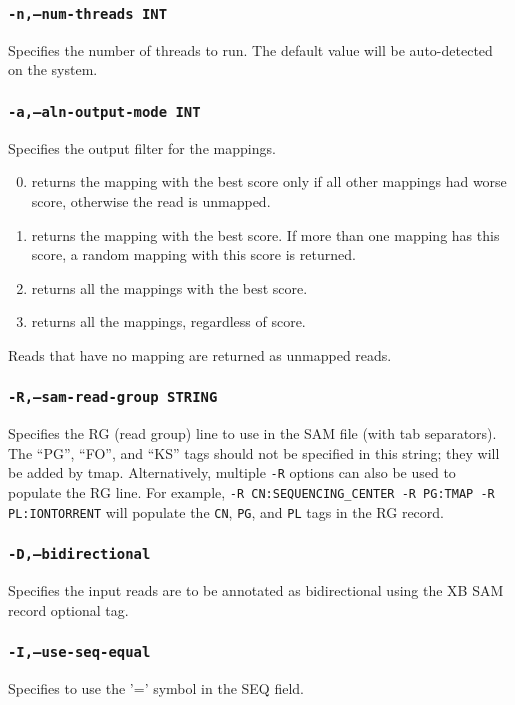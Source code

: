\documentclass[a4paper,12pt]{book}
\newcommand{\TT}[1]{{\tt #1}} %
\begin{document}
\subsubsection{\TT{-n,--num-threads INT}}
Specifies the number of threads to run.
The default value will be auto-detected on the system.

\subsubsection{\TT{-a,--aln-output-mode INT}}
Specifies the output filter for the mappings.
\begin{enumerate}
	\setcounter{enumi}{-1} %
	\item returns the mapping with the best score only if all other mappings had worse score, otherwise the read is unmapped.
	\item returns the mapping with the best score.  
		If more than one mapping has this score, a random mapping with this score is returned.
	\item returns all the mappings with the best score.
	\item returns all the mappings, regardless of score.
\end{enumerate}
Reads that have no mapping are returned as unmapped reads.

\subsubsection{\TT{-R,--sam-read-group STRING}}
Specifies the RG (read group) line to use in the SAM file (with tab separators).
The ``PG'', ``FO'', and ``KS'' tags should not be specified in this string; they will be added by tmap.
Alternatively, multiple \TT{-R} options can also be used to populate the RG line. 
For example, \TT{-R CN:SEQUENCING\_CENTER -R PG:TMAP -R PL:IONTORRENT} will populate the \TT{CN}, \TT{PG}, and \TT{PL} tags in the RG record.

\subsubsection{\TT{-D,--bidirectional}}
Specifies the input reads are to be annotated as bidirectional using the XB SAM record optional tag.

\subsubsection{\TT{-I,--use-seq-equal}}
Specifies to use the '=' symbol in the SEQ field.
\end{document}
